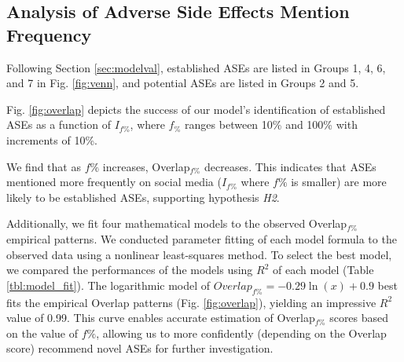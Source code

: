 \documentclass[referee,bst/sn-basic]{sn-jnl}%
\begin{document}
\begin{comment}
\begin{figure}[H]
    \centering
    \texttt{[image: images/venn5.pdf]}
    \caption{Venn diagram offering a visual representation of and distinction among ASEs.
    }
    \label{fig:venn}
\end{figure}
\end{comment}
\subsection{Analysis of Adverse Side Effects Mention Frequency}
\label{sec:model_eval}
Following Section \ref{sec:modelval}, established ASEs are listed in Groups 1, 4, 6, and 7 in Fig. \ref{fig:venn}, and potential ASEs are listed in Groups 2 and 5.

Fig. \ref{fig:overlap} depicts the success of our model's identification of established ASEs as a function of $I_{f\%}$, where $f_\%$ ranges between 10\% and 100\% with increments of 10\%.

We find that as ${f\%}$ increases, Overlap$_{f\%}$ decreases.
This indicates that ASEs mentioned more frequently on social media ($I_{f\%}$ where ${f\%}$ is smaller) are more likely to be established ASEs, supporting hypothesis \textit{H2}.

Additionally, we fit four mathematical models to the observed Overlap$_{f\%}$ empirical patterns. 
We conducted parameter fitting of each model formula to the observed data using a nonlinear least-squares method.
To select the best model, we compared the performances of the models using $R^2$ of each model (Table \ref{tbl:model_fit}).
The logarithmic model of $Overlap_{f\%} = -0.29 \ln(x) + 0.9$ best fits the empirical Overlap patterns (Fig. \ref{fig:overlap}), yielding an impressive $R^2$ value of 0.99.
This curve enables accurate estimation of Overlap$_{f\%}$ scores based on the value of ${f\%}$, allowing us to more confidently (depending on the Overlap score) recommend novel ASEs for further investigation.
\end{document}

